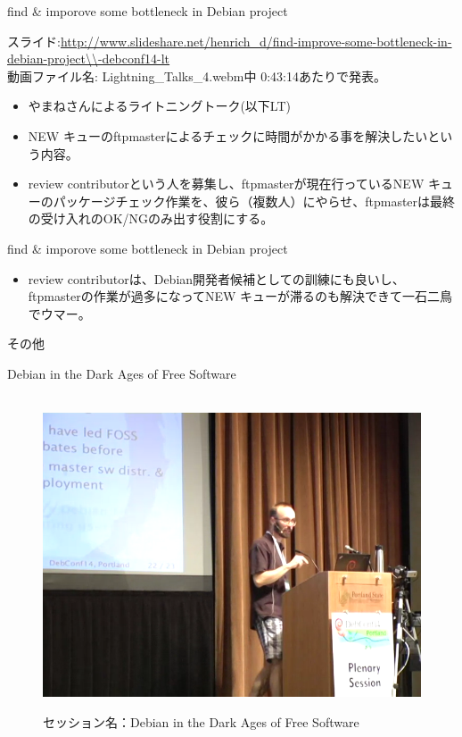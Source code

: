 \begin{frame}{find \& imporove some bottleneck in Debian project}

  スライド:\url{http://www.slideshare.net/henrich_d/find-improve-some-bottleneck-in-debian-project\\-debconf14-lt}\\
  動画ファイル名: Lightning\_Talks\_4.webm中 0:43:14あたりで発表。
  
 \begin{itemize}
  \item やまねさんによるライトニングトーク(以下LT)
  \item NEW キューのftpmasterによるチェックに時間がかかる事を解決したいという内容。
　\item review contributorという人を募集し、ftpmasterが現在行っているNEW キューのパッケージチェック作業を、彼ら（複数人）にやらせ、ftpmasterは最終の受け入れのOK/NGのみ出す役割にする。
 \end{itemize}

\end{frame}

\begin{frame}{find \& imporove some bottleneck in Debian project}

 \begin{itemize}
 \item review contributorは、Debian開発者候補としての訓練にも良いし、ftpmasterの作業が過多になってNEW キューが滞るのも解決できて一石二鳥でウマー。
\end{itemize}

\end{frame}

\begin{frame}{その他}


\end{frame}

\begin{frame}{Debian in the Dark Ages of Free Software}

\begin{figure}[H]
\begin{center}
　\includegraphics[width=0.6\hsize]{image201409/dark_age.png}
\end{center}
\caption{セッション名：Debian in the Dark Ages of Free Software}
\end{figure}

\end{frame}

